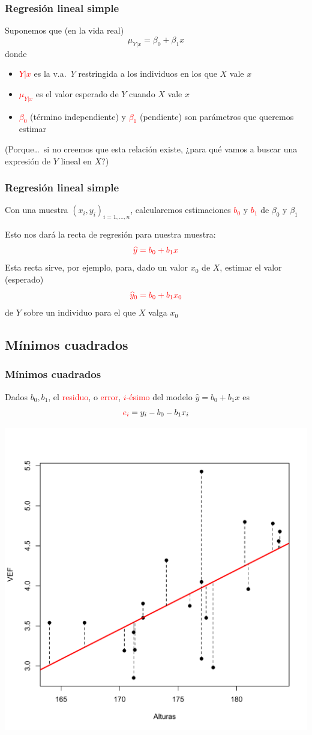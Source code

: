 \documentclass[12pt,t]{beamer}
\newcommand{\red}[1]{\textcolor{red}{#1}}
\renewcommand{\emph}[1]{{\color{red}#1}}
\theoremstyle{plain}
\theoremstyle{definition}
\begin{document}
\begin{frame}
\frametitle{Regresión lineal simple}

Suponemos que (en la vida real)
$$
\mu_{Y|x}=\beta_0+\beta_1 x
$$
donde
\begin{itemize}
\item \red{$Y|x$} es la v.a.\ $Y$ restringida a los individuos en los que $X$ vale $x$\medskip

\item \red{$\mu_{Y|x}$} es el valor esperado de $Y$ cuando $X$ vale $x$\medskip

\item \red{$\beta_0$} (\emph{término independiente}) y \red{$\beta_1$} (\emph{pendiente}) son 
parámetros que queremos estimar 
\end{itemize}\bigskip

(Porque\ldots\ si no creemos que esta relación existe, ¿para qué vamos a buscar una expresión de $Y$ lineal en $X$?)

\end{frame}

\begin{frame}
\frametitle{Regresión lineal simple}

Con una muestra $(x_i,y_i)_{i=1,\ldots,n}$, calcularemos estimaciones \red{$b_0$} y \red{$b_1$} de $\beta_0$
y  $\beta_1$
\medskip

Esto nos dará la \emph{recta de regresión} para nuestra muestra:
$$
\red{\widehat{y}=b_0+b_1 x}
$$
Esta recta sirve, por ejemplo, para, dado un valor $x_0$ de $X$, estimar el valor (esperado) 
$$
\red{\widehat{y}_0=b_0+b_1 x_0}
$$ 
de $Y$ sobre un individuo para el que $X$ valga $x_0$
\end{frame}

\subsection{Mínimos cuadrados}

\begin{frame}
\frametitle{Mínimos cuadrados}

Dados $b_0,b_1$, el \red{residuo}, o \red{error}, \red{$i$-ésimo} del modelo $\widehat{y}=b_0+b_1 x$ es
$$
\red{e_i}=y_i-b_0-b_1 x_i
$$
\begin{center}
\includegraphics[width=0.6\linewidth]{plotVEF3.pdf}
\end{center}

\end{frame}
\end{document}
